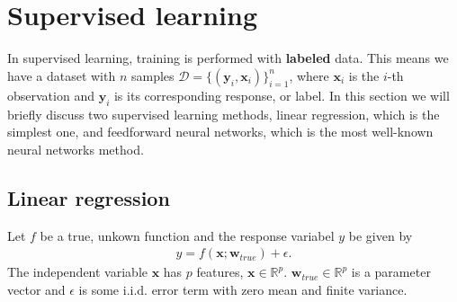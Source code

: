 \documentclass[twoside,english]{uiofysmaster}
\begin{document}


\section{Supervised learning}
In supervised learning, training is performed with \textbf{labeled} data. This means we have a dataset with $n$ samples $\mathcal{D} = \{ (\bm{y}_i, \bm{x}_i) \}_{i=1}^n$, where $\bm{x}_i$ is the $i$-th observation and $\bm{y}_i$ is its corresponding response, or label. In this section we will briefly discuss two supervised learning methods, linear regression, which is the simplest one, and feedforward neural networks, which is the most well-known neural networks method. 


\subsection{Linear regression}
Let $f$ be a true, unkown function and the response variabel $y$ be given by
\begin{align}
	y = f(\bm{x}; \bm{w}_{true}) + \epsilon.
\end{align} 
The independent variable $\bm{x}$ has $p$ features, $\bm{x} \in \mathbb{R}^p$. $\bm{w}_{true} \in \mathbb{R}^p$ is a parameter vector and $\epsilon$ is some i.i.d. error term with zero mean and finite variance.
\end{document}
